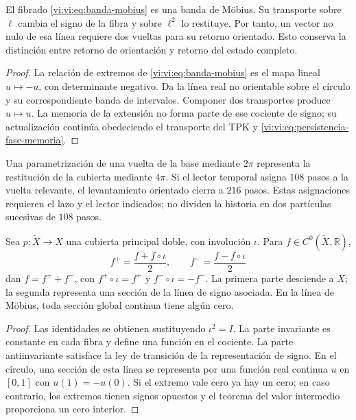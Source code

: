 \begin{theorem}
\label{vi:vi:thm:retorno-mobius}
El fibrado \eqref{vi:vi:eq:banda-mobius} es una banda de Möbius.
Su transporte sobre $\ell$ cambia el signo de la fibra y sobre
$\ell^2$ lo restituye. Por tanto, un vector no nulo de esa línea
requiere dos vueltas para su retorno orientado. Esto conserva la
distinción entre retorno de orientación y retorno del estado completo.
\end{theorem}
\begin{proof}
La relación de extremos de \eqref{vi:vi:eq:banda-mobius} es el mapa
lineal $u\mapsto-u$, con determinante negativo. Da la línea real
no orientable sobre el círculo y su correspondiente banda de
intervalos. Componer dos transportes produce $u\mapsto u$.
La memoria de la extensión no forma parte de ese cociente de signo;
su actualización continúa obedeciendo el transporte del TPK y
\eqref{vi:vi:eq:persistencia-fase-memoria}.
\end{proof}

Una parametrización de una vuelta de la base mediante $2\pi$
representa la restitución de la cubierta mediante $4\pi$. Si el
lector temporal asigna $108$ pasos a la vuelta relevante, el
levantamiento orientado cierra a $216$ pasos. Estas asignaciones
requieren el lazo y el lector indicados; no dividen la historia en
dos partículas sucesivas de $108$ pasos.

\begin{proposition}
\label{vi:vi:prop:observables-paridad}
Sea $p:\widetilde X\to X$ una cubierta principal doble, con
involución $\iota$. Para $f\in C^0(\widetilde X,\mathbb R)$,
\[
 f^+=\frac{f+f\circ\iota}{2},\qquad
 f^-=\frac{f-f\circ\iota}{2}
\]
dan $f=f^++f^-$, con $f^+\circ\iota=f^+$ y
$f^-\circ\iota=-f^-$. La primera parte desciende a $X$; la
segunda representa una sección de la línea de signo asociada. En
la línea de Möbius, toda sección global continua tiene algún cero.
\end{proposition}
\begin{proof}
Las identidades se obtienen sustituyendo $\iota^2=I$. La parte
invariante es constante en cada fibra y define una función en el
cociente. La parte antiinvariante satisface la ley de transición
de la representación de signo. En el círculo, una sección de esta
línea se representa por una función real continua $u$ en $[0,1]$
con $u(1)=-u(0)$. Si el extremo vale cero ya hay un cero; en caso
contrario, los extremos tienen signos opuestos y el teorema del
valor intermedio proporciona un cero interior.
\end{proof}

